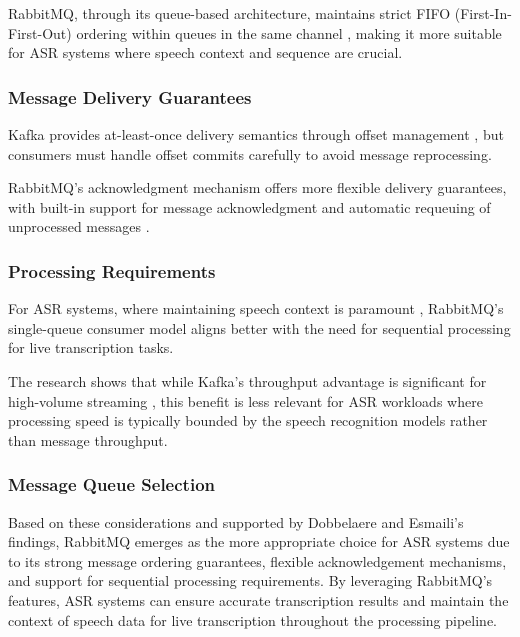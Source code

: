 RabbitMQ, through its queue-based architecture, maintains strict FIFO (First-In-First-Out) ordering within queues in the same channel \cite{kafka_v_rabbitmq}, making it more suitable for ASR systems where speech context and sequence are crucial.

\subsubsection{Message Delivery Guarantees}
Kafka provides at-least-once delivery semantics through offset management \cite{kafka_v_rabbitmq}, but consumers must handle offset commits carefully to avoid message reprocessing.

RabbitMQ's acknowledgment mechanism offers more flexible delivery guarantees, with built-in support for message acknowledgment \cite{kafka_v_rabbitmq} and automatic requeuing of unprocessed messages \cite{rabbitmq_nack}.

\subsubsection{Processing Requirements}
For ASR systems, where maintaining speech context is paramount \cite{speech_context}, RabbitMQ's single-queue consumer model aligns better with the need for sequential processing for live transcription tasks.

The research shows that while Kafka's throughput advantage is significant for high-volume streaming \cite{kafka_v_rabbitmq}, this benefit is less relevant for ASR workloads where processing speed is typically bounded by the speech recognition models rather than message throughput.

\subsubsection{Message Queue Selection} \label{subsection:research_gap}
Based on these considerations and supported by Dobbelaere and Esmaili's \cite{kafka_v_rabbitmq} findings, RabbitMQ emerges as the more appropriate choice for ASR systems due to its strong message ordering guarantees, flexible acknowledgement mechanisms, and support for sequential processing requirements. By leveraging RabbitMQ's features, ASR systems can ensure accurate transcription results and maintain the context of speech data for live transcription throughout the processing pipeline.


